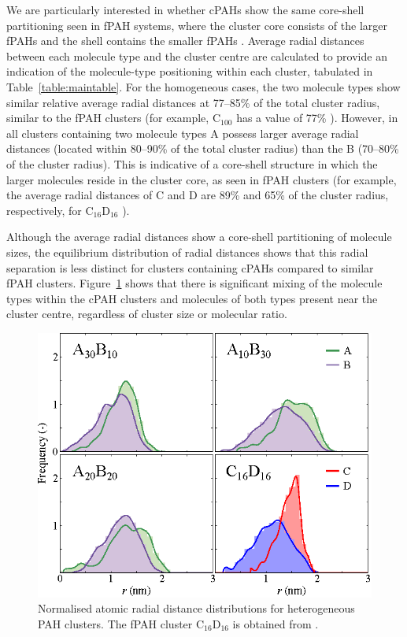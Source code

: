 We are particularly interested in whether cPAHs show the same core-shell partitioning seen in fPAH systems, where the cluster core consists of the larger fPAHs and the shell contains the smaller fPAHs \cite{bowal2018partitioning}. Average radial distances between each molecule type and the cluster centre are calculated to provide an indication of the molecule-type positioning within each cluster, tabulated in  Table~\ref{table:maintable}. For the homogeneous cases, the two molecule types show similar relative average radial distances at 77--85\% of the total cluster radius, similar to the fPAH clusters (for example, $\text{C}_{\text{100}}$ has a value of 77\% \cite{chen2014size}). However, in all clusters containing two molecule types A possess larger average radial distances (located within 80--90\% of the total cluster radius) than the B (70--80\% of the cluster radius). This is indicative of a core-shell structure in which the larger molecules reside in the cluster core, as seen in fPAH clusters (for example, the average radial distances of C and D are 89\% and 65\% of the cluster radius, respectively, for $\text{C}_{\text{16}}\text{D}_{\text{16}}$ \cite{bowal2018partitioning}).

Although the average radial distances show a core-shell partitioning of molecule sizes, the equilibrium distribution of radial distances shows that this radial separation is less distinct for clusters containing cPAHs compared to similar fPAH clusters. Figure~\ref{fig:radialdists_atomic} shows that there is significant mixing of the molecule types within the cPAH clusters and molecules of both types present near the cluster centre, regardless of cluster size or molecular ratio.
%
\begin{figure}[!tbh]
\centering
\includegraphics[width=0.6\linewidth]{Figures/radii_histograms_aa.eps}
\caption{Normalised atomic radial distance distributions for heterogeneous PAH clusters. The fPAH cluster $\text{C}_{\text{16}}\text{D}_{\text{16}}$ is obtained from \citet{bowal2018partitioning}.}
\label{fig:radialdists_atomic}
\end{figure}
%

